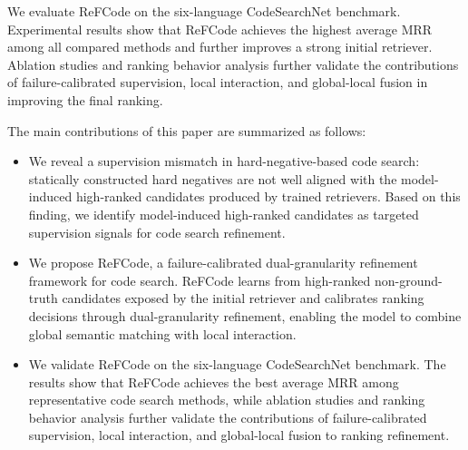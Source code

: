 \documentclass[10pt,conference]{IEEEtran}
\newcommand{\method}{ReFCode}
\begin{document}
We evaluate \method{} on the six-language CodeSearchNet benchmark. Experimental results show that \method{} achieves the highest average MRR among all compared methods and further improves a strong initial retriever. Ablation studies and ranking behavior analysis further validate the contributions of failure-calibrated supervision, local interaction, and global-local fusion in improving the final ranking.

The main contributions of this paper are summarized as follows:

\begin{itemize}
    \item We reveal a supervision mismatch in hard-negative-based code search: statically constructed hard negatives are not well aligned with the model-induced high-ranked candidates produced by trained retrievers. Based on this finding, we identify model-induced high-ranked candidates as targeted supervision signals for code search refinement.
    
    \item We propose \method{}, a failure-calibrated dual-granularity refinement framework for code search. \method{} learns from high-ranked non-ground-truth candidates exposed by the initial retriever and calibrates ranking decisions through dual-granularity refinement, enabling the model to combine global semantic matching with local interaction.
    
    \item We validate \method{} on the six-language CodeSearchNet benchmark. The results show that \method{} achieves the best average MRR among representative code search methods, while ablation studies and ranking behavior analysis further validate the contributions of failure-calibrated supervision, local interaction, and global-local fusion to ranking refinement.
\end{itemize}

\end{document}
